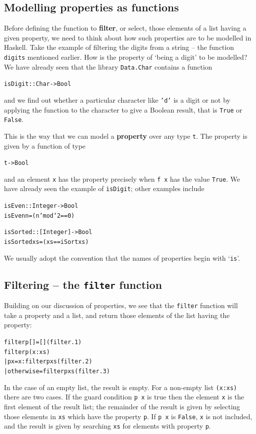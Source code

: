 \subsection*{Modelling properties as functions}

Before defining the function to \textbf{filter}, or  select, 
those elements of a list having a given property, we need to think about how such
properties are to be modelled in Haskell. Take the example of filtering
the digits from a string -- the function \texttt{digits}
mentioned earlier. How is the property of `being a digit' to be
modelled? We have already seen that the library \texttt{Data.Char} contains a function
\begin{alltt}
isDigit :: Char -> Bool
\end{alltt}
and we find out whether a particular character like \texttt{'d'} is a
digit or not by applying the function to the character to give a
Boolean result, that is \texttt{True}
or \texttt{False}.

This is the way that we can model a \textbf{property}
over any type \texttt{t}.
The property is given by a function of type
\begin{alltt}
t -> Bool 
\end{alltt}
and an element
\texttt{x} has the property precisely when \texttt{f x} has the value
\texttt{True}. We have already seen the example of \texttt{isDigit};
other examples include
\begin{alltt}
isEven :: Integer -> Bool
isEven n = (n `mod` 2 == 0)

isSorted :: [Integer] -> Bool
isSorted xs = (xs == iSort xs)
\end{alltt}
We usually adopt the convention that the names of properties begin with `\texttt{is}'.

\subsection*{Filtering -- the \texttt{filter} function}

Building on our discussion of properties, we see that the \texttt{filter}
function will take a property and a list, and return those elements of
the list having the property:
\begin{alltt}
filter p [] = []\hfill(filter.1)
filter p (x:xs)
  | p x         = x : filter p xs\hfill(filter.2)
  | otherwise   =     filter p xs\hfill(filter.3)
\end{alltt}
In the case of an empty list, the result is empty.
For a non-empty list
\texttt{(x:xs)} there are two cases. If the guard condition \texttt{p x} is
true then the element \texttt{x} is the first element of the result list; the remainder
of the result is given by selecting those elements in \texttt{xs} which have the property 
\texttt{p}. If \texttt{p x} is \texttt{False}, \texttt{x} is not included, and the result is
given by searching \texttt{xs} for elements with 
property \texttt{p}.

